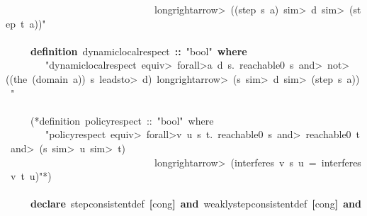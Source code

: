 \documentclass{article}
\newcommand{\syntaxCOMMENTA}[1]{\textcolor[rgb]{0.8,0.0,0.0}{#1}}
\newcommand{\syntaxKEYWORDA}[1]{\textcolor[rgb]{0.0,0.4,0.6}{\textbf{#1}}}
\newcommand{\syntaxKEYWORDB}[1]{\textcolor[rgb]{0.0,0.6,0.4}{\textbf{#1}}}
\newcommand{\syntaxLITERALA}[1]{\textcolor[rgb]{1.0,0.0,0.8}{#1}}
\newcommand{\syntaxOPERATOR}[1]{\textcolor[rgb]{0.0,0.0,0.0}{\textbf{#1}}}
\newcommand{\syntaxCOMMENTA}[1]{\textcolor[rgb]{0.8,0.0,0.0}{#1}}
\newcommand{\syntaxKEYWORDA}[1]{\textcolor[rgb]{0.0,0.4,0.6}{\textbf{#1}}}
\newcommand{\syntaxKEYWORDB}[1]{\textcolor[rgb]{0.0,0.6,0.4}{\textbf{#1}}}
\newcommand{\syntaxLITERALA}[1]{\textcolor[rgb]{1.0,0.0,0.8}{#1}}
\newcommand{\syntaxOPERATOR}[1]{\textcolor[rgb]{0.0,0.0,0.0}{\textbf{#1}}}
\newcommand{\syntaxCOMMENTA}[1]{\textcolor[rgb]{0.8,0.0,0.0}{#1}}
\newcommand{\syntaxKEYWORDA}[1]{\textcolor[rgb]{0.0,0.4,0.6}{\textbf{#1}}}
\newcommand{\syntaxKEYWORDB}[1]{\textcolor[rgb]{0.0,0.6,0.4}{\textbf{#1}}}
\newcommand{\syntaxLITERALA}[1]{\textcolor[rgb]{1.0,0.0,0.8}{#1}}
\newcommand{\syntaxOPERATOR}[1]{\textcolor[rgb]{0.0,0.0,0.0}{\textbf{#1}}}
\newcommand{\syntaxCOMMENTA}[1]{\textcolor[rgb]{0.8,0.0,0.0}{\textbf{#1}}}
\newcommand{\syntaxKEYWORDA}[1]{\textcolor[rgb]{0.0,0.4,0.6}{#1}}
\newcommand{\syntaxKEYWORDB}[1]{\textcolor[rgb]{0.0,0.6,0.4}{#1}}
\newcommand{\syntaxLITERALA}[1]{\textcolor[rgb]{1.0,0.0,0.8}{\textbf{#1}}}
\newcommand{\syntaxOPERATOR}[1]{\textcolor[rgb]{0.0,0.0,0.0}{#1}}
\newcommand{\syntaxCOMMENTA}[1]{\textcolor[rgb]{0.8,0.0,0.0}{#1}}
\newcommand{\syntaxKEYWORDA}[1]{\textcolor[rgb]{0.0,0.4,0.6}{\textbf{#1}}}
\newcommand{\syntaxKEYWORDB}[1]{\textcolor[rgb]{0.0,0.6,0.4}{\textbf{#1}}}
\newcommand{\syntaxLITERALA}[1]{\textcolor[rgb]{1.0,0.0,0.8}{#1}}
\newcommand{\syntaxOPERATOR}[1]{\textcolor[rgb]{0.0,0.0,0.0}{\textbf{#1}}}
\newcommand{\syntaxCOMMENTA}[1]{\textcolor[rgb]{0.8,0.0,0.0}{#1}}
\newcommand{\syntaxKEYWORDA}[1]{\textcolor[rgb]{0.0,0.4,0.6}{\textbf{#1}}}
\newcommand{\syntaxKEYWORDB}[1]{\textcolor[rgb]{0.0,0.6,0.4}{\textbf{#1}}}
\newcommand{\syntaxLITERALA}[1]{\textcolor[rgb]{1.0,0.0,0.8}{#1}}
\newcommand{\syntaxOPERATOR}[1]{\textcolor[rgb]{0.0,0.0,0.0}{\textbf{#1}}}
\begin{document}
\syntaxLITERALA{{\ }{\ }{\ }{\ }{\ }{\ }{\ }{\ }{\ }{\ }{\ }{\ }{\ }{\ }{\ }{\ }{\ }{\ }{\ }{\ }{\ }{\ }{\ }{\ }{\ }{\ }{\ }{\ }{\ }{\ }\<longrightarrow>{\ }((step{\ }s{\ }a){\ }\<sim>{\ }d{\ }\<sim>{\ }(step{\ }t{\ }a))"}\hspace*{\fill}\\
\hspace*{\fill}\\
{\ }{\ }{\ }{\ }{\ }\syntaxKEYWORDA{definition}{\ }dynamic\usebox{\underscorebox}local\usebox{\underscorebox}respect{\ }\syntaxOPERATOR{::}{\ }\syntaxLITERALA{"bool"}{\ }\syntaxKEYWORDB{where}\hspace*{\fill}\\
{\ }{\ }{\ }{\ }{\ }{\ }{\ }{\ }\syntaxLITERALA{"dynamic\usebox{\underscorebox}local\usebox{\underscorebox}respect{\ }\<equiv>{\ }\<forall>a{\ }d{\ }s.{\ }reachable0{\ }s{\ }\<and>{\ }\<not>((the{\ }(domain{\ }a)){\ }\usebox{\atbox}{\ }s{\ }\<leadsto>{\ }d){\ }\<longrightarrow>{\ }(s{\ }\<sim>{\ }d{\ }\<sim>{\ }(step{\ }s{\ }a)){\ }"}\hspace*{\fill}\\
\hspace*{\fill}\\
{\ }{\ }{\ }{\ }{\ }\syntaxCOMMENTA{(*definition{\ }policy\usebox{\underscorebox}respect{\ }::{\ }"bool"{\ }where{\ }{\ }{\ }{\ }{\ }{\ }{\ }{\ }{\ }{\ }{\ }{\ }{\ }{\ }{\ }{\ }{\ }{\ }{\ }{\ }{\ }{\ }{\ }{\ }{\ }{\ }{\ }}\hspace*{\fill}\\
\syntaxCOMMENTA{{\ }{\ }{\ }{\ }{\ }{\ }{\ }{\ }"policy\usebox{\underscorebox}respect{\ }\<equiv>{\ }\<forall>v{\ }u{\ }s{\ }t.{\ }reachable0{\ }s{\ }\<and>{\ }reachable0{\ }t{\ }\<and>{\ }(s{\ }\<sim>{\ }u{\ }\<sim>{\ }t)}\hspace*{\fill}\\
\syntaxCOMMENTA{{\ }{\ }{\ }{\ }{\ }{\ }{\ }{\ }{\ }{\ }{\ }{\ }{\ }{\ }{\ }{\ }{\ }{\ }{\ }{\ }{\ }{\ }{\ }{\ }{\ }{\ }{\ }{\ }{\ }{\ }\<longrightarrow>{\ }(interferes{\ }v{\ }s{\ }u{\ }={\ }interferes{\ }v{\ }t{\ }u)"*)}\hspace*{\fill}\\
\hspace*{\fill}\\
{\ }{\ }{\ }{\ }{\ }\syntaxKEYWORDA{declare}{\ }step\usebox{\underscorebox}consistent\usebox{\underscorebox}def{\ }\syntaxOPERATOR{{[}}cong\syntaxOPERATOR{{]}}{\ }\syntaxKEYWORDB{and}{\ }weakly\usebox{\underscorebox}step\usebox{\underscorebox}consistent\usebox{\underscorebox}def{\ }\syntaxOPERATOR{{[}}cong\syntaxOPERATOR{{]}}{\ }\syntaxKEYWORDB{and}{\ }\hspace*{\fill}\\
\end{document}
